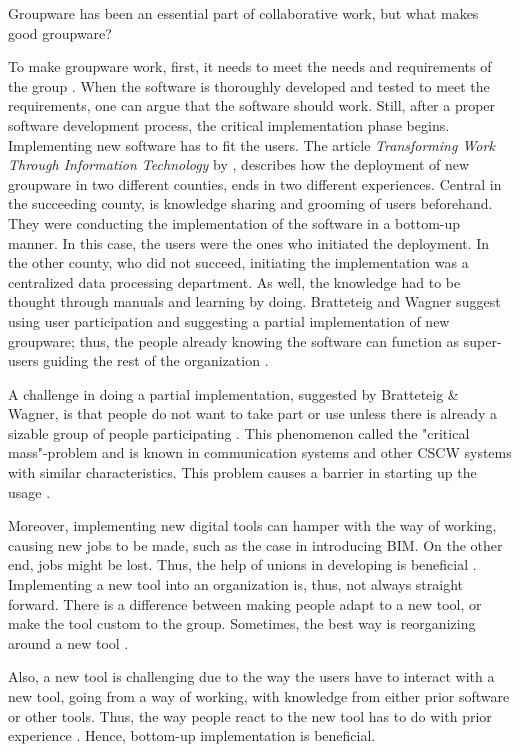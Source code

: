 Groupware has been an essential part of collaborative work, but what makes good groupware? 

To make groupware work, first, it needs to meet the needs and requirements of the group \cite{subramanyam2010user}. When the software is thoroughly developed and tested to meet the requirements, one can argue that the software should work. Still, after a proper software development process, the critical implementation phase begins. Implementing new software has to fit the users. The article \textit{Transforming Work Through Information Technology} by \cite{Robey&Sahay}, describes how the deployment of new groupware in two different counties, ends in two different experiences. Central in the succeeding county, is knowledge sharing and grooming of users beforehand. They were conducting the implementation of the software in a bottom-up manner. In this case, the users were the ones who initiated the deployment. In the other county, who did not succeed, initiating the implementation was a centralized data processing department. As well, the knowledge had to be thought through manuals and learning by doing. Bratteteig and Wagner suggest using user participation and suggesting a partial implementation of new groupware; thus, the people already knowing the software can function as super-users guiding the rest of the organization \cite{bratteteig2016unpacking}.

A challenge in doing a partial implementation, suggested by Bratteteig \& Wagner, is that people do not want to take part or use unless there is already a sizable group of people participating \cite{grudin1989groupware}. This phenomenon called the "critical mass"-problem and is known in communication systems and other CSCW systems with similar characteristics. This problem causes a barrier in starting up the usage \cite{markus1987toward}. 

Moreover, implementing new digital tools can hamper with the way of working, causing new jobs to be made, such as the case in introducing BIM. On the other end, jobs might be lost. Thus, the help of unions in developing is beneficial \cite{ehn1993scandinavian}. Implementing a new tool into an organization is, thus, not always straight forward. There is a difference between making people adapt to a new tool, or make the tool custom to the group. Sometimes, the best way is reorganizing around a new tool \cite{hammer1990reengineering}.  

Also, a new tool is challenging due to the way the users have to interact with a new tool, going from a way of working, with knowledge from either prior software or other tools. Thus, the way people react to the new tool has to do with prior experience \cite{orlikowski1992learning}. Hence, bottom-up implementation is beneficial. 

